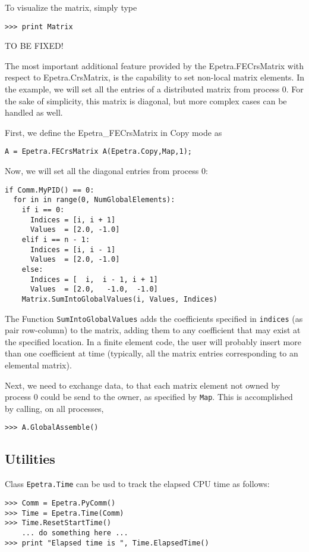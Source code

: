 \documentclass[10pt,relax]{SANDreport}
\begin{document}
To visualize the matrix, simply type
\begin{verbatim}
>>> print Matrix
\end{verbatim}

\medskip

TO BE FIXED!

The most important additional feature provided by the
Epetra.FECrsMatrix with respect to Epetra.CrsMatrix, is the capability
to set non-local matrix elements. In the
example, we will set all the entries of a distributed matrix from
process 0. For the sake of simplicity, this matrix is diagonal, but more
complex cases can be handled as well.

First, we define the Epetra\_FECrsMatrix in Copy mode as
\begin{verbatim}
A = Epetra.FECrsMatrix A(Epetra.Copy,Map,1);
\end{verbatim}
Now, we will set all the diagonal entries from process 0:
\begin{verbatim}
if Comm.MyPID() == 0:
  for in in range(0, NumGlobalElements):
    if i == 0:
      Indices = [i, i + 1]
      Values  = [2.0, -1.0]
    elif i == n - 1:
      Indices = [i, i - 1]
      Values  = [2.0, -1.0]
    else:
      Indices = [  i,  i - 1, i + 1]
      Values  = [2.0,   -1.0,  -1.0]
    Matrix.SumIntoGlobalValues(i, Values, Indices)
\end{verbatim}
The Function \verb!SumIntoGlobalValues! adds the coefficients specified
in \verb!indices! (as pair row-column) to the matrix, adding them to any
coefficient that may exist at the specified location. In a finite
element code, the user will probably insert more than one coefficient
at time (typically, all the matrix entries corresponding to an elemental
matrix).

Next, we need to exchange data, to that each matrix element not owned by
process 0 could be send to the owner, as specified by \verb!Map!. This
is accomplished by calling, on all processes,
\begin{verbatim}
>>> A.GlobalAssemble()
\end{verbatim}

\subsection{Utilities}
\label{sec:utilities}

Class {\tt Epetra.Time} can be usd to track the elapsed CPU time as follows:
\begin{verbatim}
>>> Comm = Epetra.PyComm()
>>> Time = Epetra.Time(Comm)
>>> Time.ResetStartTime()
    ... do something here ...
>>> print "Elapsed time is ", Time.ElapsedTime()
\end{verbatim}
\end{document}
